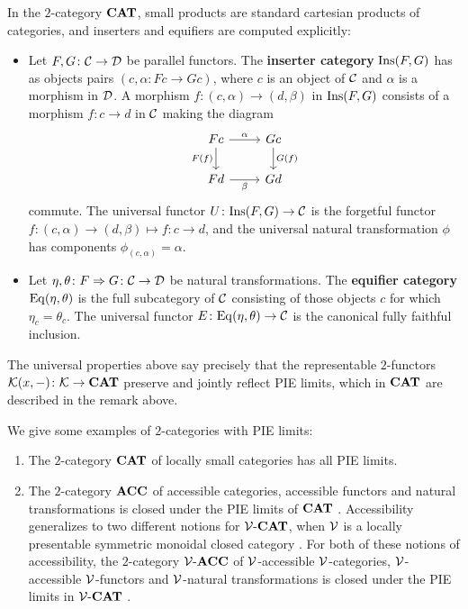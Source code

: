 \begin{remark}
   In the $2$-category $\mathbf{CAT}$, small products are standard cartesian products of categories, and inserters and equifiers are computed explicitly:
   \begin{itemize}
       \item Let $F, G \colon \mathcal{C} \to \mathcal{D}$ be parallel functors. The \textbf{inserter category} $\mathrm{Ins}(F, G)$ has as objects pairs $(c, \alpha\colon Fc\to Gc)$, where $c$ is an object of $\mathcal{C}$ and $\alpha$ is a morphism in $\mathcal{D}$. A morphism $f\colon (c,\alpha)\to (d,\beta)$ in $\mathrm{Ins}(F,G)$ consists of a morphism $f\colon c\to d$ in $\mathcal{C}$ making the diagram
       \[
       \begin{tikzcd}
Fc \arrow[d, "F(f)"'] \arrow[r, "\alpha"] & Gc \arrow[d, "G(f)"] \\
Fd \arrow[r, "\beta"']                             & Gd
       \end{tikzcd}
       \]
       commute. The universal functor $U \colon \mathrm{Ins}(F, G) \to \mathcal{C}$ is the forgetful functor $f\colon (c,\alpha)\to (d,\beta)\mapsto f\colon c\to d$, and the universal natural transformation $\phi$ has components $\phi_{(c,\alpha)} = \alpha$.

       \item Let $\eta,\theta\colon F\Rightarrow G\colon \mathcal{C}\to \mathcal{D}$ be natural transformations. The \textbf{equifier category} $\mathrm{Eq}(\eta, \theta)$ is the full subcategory of $\mathcal{C}$ consisting of those objects $c$ for which $\eta_c = \theta_c$. The universal functor $E \colon \mathrm{Eq}(\eta, \theta) \to \mathcal{C}$ is the canonical fully faithful inclusion.
   \end{itemize}
\end{remark}
The universal properties above say precisely that the representable $2$-functors $\mathcal{K}(x,-)\colon \mathcal{K}\to \mathbf{CAT}$ preserve and jointly reflect PIE limits, which in $\mathbf{CAT}$ are described in the remark above.
\begin{example}
    We give some examples of $2$-categories with PIE limits:
    \begin{enumerate}
        \item The $2$-category $\mathbf{CAT}$ of locally small categories has all PIE limits.
        \item The $2$-category $\mathbf{ACC}$ of accessible categories, accessible functors and natural transformations is closed under the PIE limits of $\mathbf{CAT}$ \cite{MakkaiPare1989AccessibleCategories, LPC}. Accessibility generalizes to two different notions for $\mathcal{V}\text{-}\mathbf{CAT}$, when $\mathcal{V}$ is a locally presentable symmetric monoidal closed category \cite{LACK2023107196}. For both of these notions of accessibility, the $2$-category $\mathcal{V}\text{-}\mathbf{ACC}$ of $\mathcal{V}$-accessible $\mathcal{V}$-categories, $\mathcal{V}$-accessible $\mathcal{V}$-functors and $\mathcal{V}$-natural transformations is closed under the PIE limits in $\mathcal{V}\text{-}\mathbf{CAT}$ \cite[Theorem 5.5, Theorem 5.9]{LACK2023107196}.
    \end{enumerate}
\end{example}